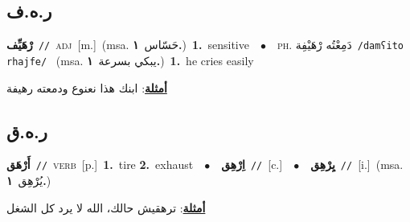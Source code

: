 \documentclass[10pt,a4paper,twoside]{article} %
\begin{document}
\begin{multicols}{2}
\vspace{-3mm}
\subsection*{\color{blue}\foreignlanguage{arabic}{ر.ه.ف}\color{blue}{}} 

{\setlength\topsep{0pt}\textbf{\foreignlanguage{arabic}{رْهَيِّف}}\ {\color{gray}\texttt{//}\color{black}}\ \textsc{adj}\ [m.]\ \color{gray}(msa. \foreignlanguage{arabic}{حَسّاس}~\foreignlanguage{arabic}{\textbf{١.}})\color{black}\ \textbf{1.}~sensitive\ \ $\bullet$\ \ \textsc{ph.} \color{gray} \foreignlanguage{arabic}{دَمِعْتُه رْهَيْفِة}\color{black}\ {\color{gray}\texttt{/{\sffamily damʕito rhajfe}/}\color{black}}\ \color{gray} (msa. \foreignlanguage{arabic}{يبكي بسرعة}~\foreignlanguage{arabic}{\textbf{١.}})\color{black}\ \textbf{1.}~he cries easily\  \begin{flushright}\color{gray}\foreignlanguage{arabic}{\textbf{\underline{\foreignlanguage{arabic}{أمثلة}}}: ابنك هذا نعنوع ودمعته رهيفة}\end{flushright}\color{black}} \vspace{2mm}

\vspace{-3mm}
\subsection*{\color{blue}\foreignlanguage{arabic}{ر.ه.ق}\color{blue}{}} 

{\setlength\topsep{0pt}\textbf{\foreignlanguage{arabic}{أَرْهَق}}\ {\color{gray}\texttt{//}\color{black}}\ \textsc{verb}\ [p.]\ \textbf{1.}~tire  \textbf{2.}~exhaust\ \ $\bullet$\ \ \setlength\topsep{0pt}\textbf{\foreignlanguage{arabic}{اِرْهِق}}\ {\color{gray}\texttt{//}\color{black}}\ [c.]\ \ $\bullet$\ \ \setlength\topsep{0pt}\textbf{\foreignlanguage{arabic}{يِرْهِق}}\ {\color{gray}\texttt{//}\color{black}}\ [i.]\ \color{gray}(msa. \foreignlanguage{arabic}{يُرْهِق}~\foreignlanguage{arabic}{\textbf{١.}})\color{black}\  \begin{flushright}\color{gray}\foreignlanguage{arabic}{\textbf{\underline{\foreignlanguage{arabic}{أمثلة}}}: ترهقيش حالك، الله لا يرد كل الشغل}\end{flushright}\color{black}} \vspace{2mm}


\end{multicols}
\end{document}
